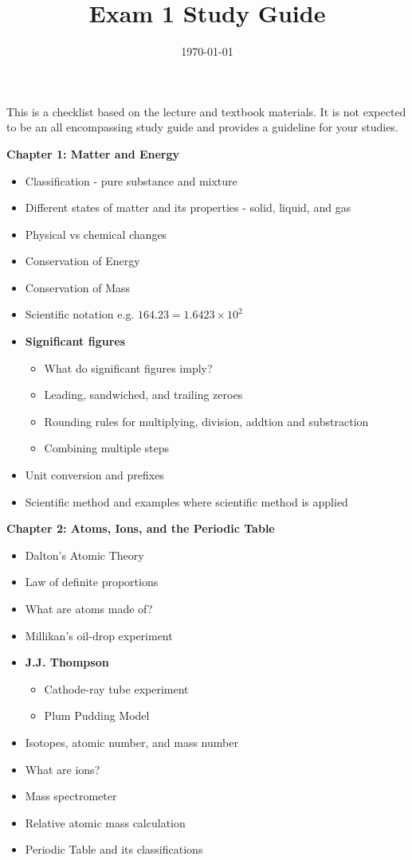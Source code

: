 \documentclass[12pt]{article}
\title{\textbf{Exam 1 Study Guide}}
\date{\today}
\begin{document}
\maketitle 

This is a checklist based on the lecture and textbook materials. It is not
expected to be an all encompassing study guide and provides a guideline for
your studies.

\textbf{Chapter 1: Matter and Energy}

\begin{itemize}
  \setlength\itemsep{0em}
\item Classification - pure substance and mixture
\item Different states of matter and its properties - solid, liquid, and gas
\item Physical vs chemical changes
\item Conservation of Energy
\item Conservation of Mass
\item Scientific notation e.g. $164.23 = 1.6423 \times 10^2$
\item[] \textbf{Significant figures}
  \begin{itemize}
  \item What do significant figures imply?
  \item Leading, sandwiched, and trailing zeroes
  \item Rounding rules for multiplying, division, addtion and substraction
  \item Combining multiple steps
  \end{itemize}
\item Unit conversion and prefixes
\item Scientific method and examples where scientific method is applied
\end{itemize}

\textbf{Chapter 2: Atoms, Ions, and the Periodic Table}

\begin{itemize}
  \setlength\itemsep{0em}
\item Dalton's Atomic Theory
\item Law of definite proportions
\item What are atoms made of?
\item Millikan's oil-drop experiment
\item[] \textbf{J.J. Thompson}
  \begin{itemize}
  \item Cathode-ray tube experiment
  \item Plum Pudding Model
  \end{itemize}
\item Isotopes, atomic number, and mass number
\item What are ions?
\item Mass spectrometer
\item Relative atomic mass calculation
\item Periodic Table and its classifications
\end{itemize}
\end{document}
